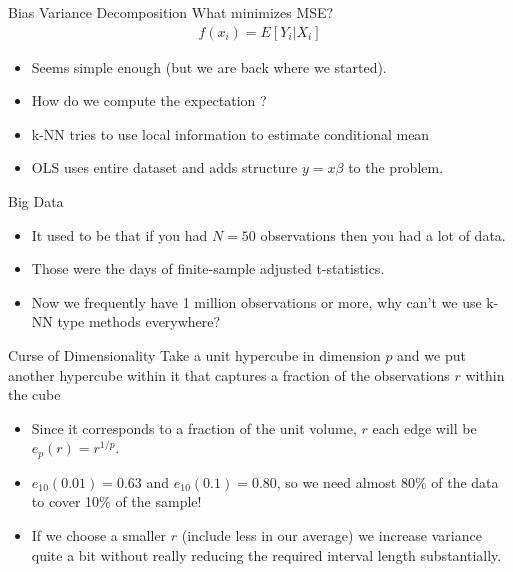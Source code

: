 \begin{frame}{Bias Variance Decomposition}
What minimizes MSE?
\begin{eqnarray*}
f(x_i) = E[Y_i | X_i] 
\end{eqnarray*}
\begin{itemize}
\item Seems simple enough (but we are back where we started).
\item How do we compute the expectation ?
\item k-NN tries to use local information to estimate conditional mean
\item OLS uses entire dataset and adds structure $ y = x \beta$ to the problem.
\end{itemize}
\end{frame}


\begin{frame}{Big Data}
\begin{itemize}
\item It used to be that if you had $N=50$ observations then you had a lot of data.
\item Those were the days of finite-sample adjusted t-statistics.
\item Now we frequently have 1 million observations or more, why can't we use k-NN type methods everywhere?
\end{itemize}
\end{frame}

\begin{frame}{Curse of Dimensionality}
Take a unit hypercube in dimension $p$ and we put another hypercube within it that captures a fraction of the observations $r$ within the cube
\begin{itemize}
\item Since it corresponds to a fraction of the unit volume, $r$ each edge  will be $e_p(r) = r^{1/p}$.
\item $e_{10}(0.01) = 0.63$ and $e_{10}(0.1) = 0.80$, so we need almost 80\% of the data to cover 10\% of the sample!
\item If we choose a smaller $r$ (include less in our average) we increase variance quite a bit without really reducing the required interval length substantially.
\end{itemize}
\end{frame}

